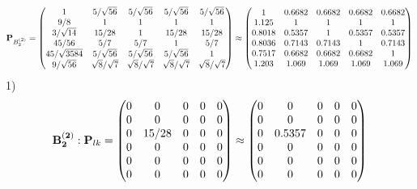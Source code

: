 \documentclass[10pt,a4paper]{article}
\begin{document}
	\[
		\bold{P}_{B_2^{(2)}} = 
		\begin{pmatrix}
			{1}{} & {{5}} / {\sqrt{56}} & {{5}} / {\sqrt{56}} & {{5}} / {\sqrt{56}} & {{5}} / {\sqrt{56}} \\
			{{9}} / {{8}} & {1}{} & {1}{} & {1}{} & {1}{} \\
			{{3}} / {\sqrt{14}} & {{15}} / {{28}} & {1}{} & {{15}} / {{28}} & {{15}} / {{28}} \\
			{{45}} / {{56}} & {{5}} / {{7}} & {{5}} / {{7}} & {1}{} & {{5}} / {{7}} \\
			{{45}} / {\sqrt{3584}} & {{5}} / {\sqrt{56}} & {{5}} / {\sqrt{56}} & {{5}} / {\sqrt{56}} & {1}{} \\
			{{9}} / {\sqrt{56}} & {\sqrt{8}} / {\sqrt{7}} & {\sqrt{8}} / {\sqrt{7}} & {\sqrt{8}} / {\sqrt{7}} & {\sqrt{8}} / {\sqrt{7}} \\
		\end{pmatrix}
		\approx
		\begin{pmatrix}
			1        & 0.6682   & 0.6682   & 0.6682   & 0.6682   \\
			1.125    & 1        & 1        & 1        & 1        \\
			0.8018   & 0.5357   & 1        & 0.5357   & 0.5357   \\
			0.8036   & 0.7143   & 0.7143   & 1        & 0.7143   \\
			0.7517   & 0.6682   & 0.6682   & 0.6682   & 1        \\
			1.203    & 1.069    & 1.069    & 1.069    & 1.069    \\
		\end{pmatrix}
	\]
	1)
	\[
		\bold{B_2^{(2)}}: \bold{P}_{lk} = 
		\begin{pmatrix}
			{{0}}{} & {{0}}{} & {{0}}{} & {{0}}{} & {{0}}{} \\
			{{0}}{} & {{0}}{} & {{0}}{} & {{0}}{} & {{0}}{} \\
			{{0}}{} & {{15}} / {{28}} & {{0}}{} & {{0}}{} & {{0}}{} \\
			{{0}}{} & {{0}}{} & {{0}}{} & {{0}}{} & {{0}}{} \\
			{{0}}{} & {{0}}{} & {{0}}{} & {{0}}{} & {{0}}{} \\
			{{0}}{} & {{0}}{} & {{0}}{} & {{0}}{} & {{0}}{} \\
		\end{pmatrix}
		\approx
		\begin{pmatrix}
			0        & 0        & 0        & 0        & 0        \\
			0        & 0        & 0        & 0        & 0        \\
			0        & 0.5357   & 0        & 0        & 0        \\
			0        & 0        & 0        & 0        & 0        \\
			0        & 0        & 0        & 0        & 0        \\
			0        & 0        & 0        & 0        & 0        \\
		\end{pmatrix}
	\]
\end{document}
